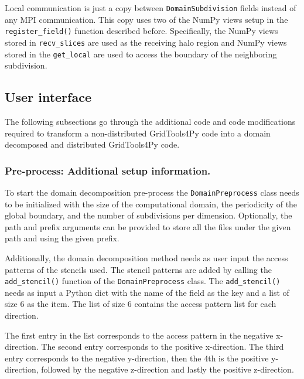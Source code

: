 Local communication is just a copy between \texttt{DomainSubdivision} fields instead of any MPI communication.
This copy uses two of the NumPy views setup in the \texttt{register\_field()} function described before.
Specifically, the NumPy views stored in \texttt{recv\_slices} are used as the receiving halo region and NumPy views stored in the \texttt{get\_local} are used to access the boundary of the neighboring subdivision.


\newpage
\subsection{User interface}
The following subsections go through the additional code and code modifications required to transform a non-distributed GridTools4Py code into a domain decomposed and distributed GridTools4Py code.

\subsubsection{Pre-process: Additional setup information.}
\label{sec:userpreprocess}
To start the domain decomposition pre-process the \texttt{DomainPreprocess} class needs to be initialized with the size of the computational domain, the periodicity of the global boundary, and the number of subdivisions per dimension.
Optionally, the path and prefix arguments can be provided to store all the files under the given path and using the given prefix.

Additionally, the domain decomposition method needs as user input the access patterns of the stencils used.
The stencil patterns are added by calling the \texttt{add\_stencil()} function of the \texttt{DomainPreprocess} class.
The \texttt{add\_stencil()} needs as input a Python dict with the name of the field as the key and a list of size 6 as the item.
The list of size 6 contains the access pattern list for each direction.

The first entry in the list corresponds to the access pattern in the negative x-direction.
The second entry corresponds to the positive x-direction.
The third entry corresponds to the negative y-direction, then the 4th is the positive y-direction, followed by the negative z-direction and lastly the positive z-direction.

